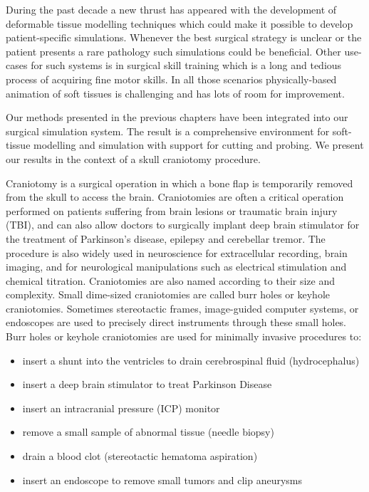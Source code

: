 \label{chapter:evaluation}
During the past decade a new thrust has appeared with the development of deformable tissue modelling techniques which could make it
possible to develop patient-specific simulations. Whenever the best surgical strategy is unclear or the patient presents a rare
pathology such simulations could be beneficial. Other use-cases for such systems is in surgical skill training which is a long 
and tedious process of acquiring fine motor skills. In all those scenarios physically-based animation of soft tissues is challenging and 
has lots of room for improvement. 

Our methods presented in the previous chapters have been integrated into our surgical simulation system. 
The result is a comprehensive environment for soft-tissue modelling and simulation with support for cutting and
probing. We present our results in the context of a skull craniotomy procedure.

Craniotomy is a surgical operation in which a bone flap is temporarily removed 
from the skull to access the brain. Craniotomies are often a critical operation performed on patients suffering 
from brain lesions or traumatic brain injury (TBI), and can also allow doctors to surgically implant deep brain 
stimulator for the treatment of Parkinson's disease, epilepsy and cerebellar tremor. The procedure is also widely 
used in neuroscience for extracellular recording, brain imaging, and for neurological manipulations such as electrical 
stimulation and chemical titration. Craniotomies are also named according to their size and complexity. Small dime-sized 
craniotomies are called burr holes or keyhole craniotomies. Sometimes stereotactic frames, image-guided computer systems, 
or endoscopes are used to precisely direct instruments through these small holes. Burr holes or keyhole craniotomies are 
used for minimally invasive procedures to:

\begin{itemize}
 \item insert a shunt into the ventricles to drain cerebrospinal fluid (hydrocephalus)
 \item insert a deep brain stimulator to treat Parkinson Disease
 \item insert an intracranial pressure (ICP) monitor
 \item remove a small sample of abnormal tissue (needle biopsy)
 \item drain a blood clot (stereotactic hematoma aspiration)
 \item insert an endoscope to remove small tumors and clip aneurysms
\end{itemize}


